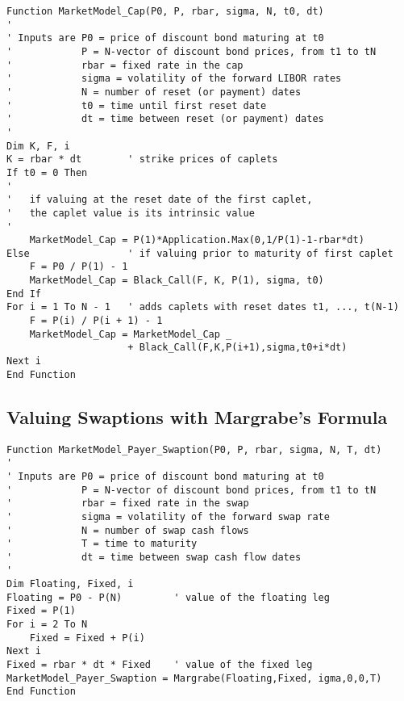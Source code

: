 \small\begin{verbatim}
Function MarketModel_Cap(P0, P, rbar, sigma, N, t0, dt)
'
' Inputs are P0 = price of discount bond maturing at t0
'            P = N-vector of discount bond prices, from t1 to tN
'            rbar = fixed rate in the cap
'            sigma = volatility of the forward LIBOR rates
'            N = number of reset (or payment) dates
'            t0 = time until first reset date
'            dt = time between reset (or payment) dates
'
Dim K, F, i
K = rbar * dt        ' strike prices of caplets
If t0 = 0 Then
'
'   if valuing at the reset date of the first caplet,
'   the caplet value is its intrinsic value
'
    MarketModel_Cap = P(1)*Application.Max(0,1/P(1)-1-rbar*dt)
Else                 ' if valuing prior to maturity of first caplet
    F = P0 / P(1) - 1
    MarketModel_Cap = Black_Call(F, K, P(1), sigma, t0)
End If
For i = 1 To N - 1   ' adds caplets with reset dates t1, ..., t(N-1)
    F = P(i) / P(i + 1) - 1
    MarketModel_Cap = MarketModel_Cap _
                     + Black_Call(F,K,P(i+1),sigma,t0+i*dt)
Next i
End Function
\end{verbatim}\normalsize

\subsection*{Valuing Swaptions with Margrabe's Formula}

\small\begin{verbatim}
Function MarketModel_Payer_Swaption(P0, P, rbar, sigma, N, T, dt)
'
' Inputs are P0 = price of discount bond maturing at t0
'            P = N-vector of discount bond prices, from t1 to tN
'            rbar = fixed rate in the swap
'            sigma = volatility of the forward swap rate
'            N = number of swap cash flows
'            T = time to maturity
'            dt = time between swap cash flow dates
'
Dim Floating, Fixed, i
Floating = P0 - P(N)         ' value of the floating leg
Fixed = P(1)
For i = 2 To N
    Fixed = Fixed + P(i)
Next i
Fixed = rbar * dt * Fixed    ' value of the fixed leg
MarketModel_Payer_Swaption = Margrabe(Floating,Fixed, igma,0,0,T)
End Function
\end{verbatim}\normalsize

